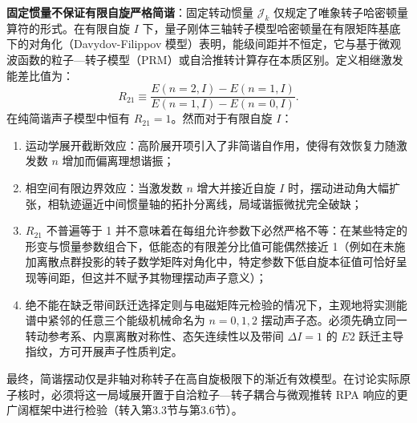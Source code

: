 \textbf{固定惯量不保证有限自旋严格简谐}：固定转动惯量 $\mathcal{J}_k$ 仅规定了唯象转子哈密顿量算符的形式。在有限自旋 $I$ 下，量子刚体三轴转子模型哈密顿量在有限矩阵基底下的对角化（Davydov-Filippov 模型）表明，能级间距并不恒定，它与基于微观波函数的粒子—转子模型（PRM）或自洽推转计算存在本质区别。定义相继激发能差比值为：
\begin{equation}\label{eq:3-2-anharmonic-ratio}
R_{21} \equiv \frac{E(n=2, I) - E(n=1, I)}{E(n=1, I) - E(n=0, I)}.
\end{equation}
在纯简谐声子模型中恒有 $R_{21} = 1$。然而对于有限自旋 $I$：
\begin{enumerate}
\item 运动学展开截断效应：高阶展开项引入了非简谐自作用，使得有效恢复力随激发数 $n$ 增加而偏离理想谐振；
\item 相空间有限边界效应：当激发数 $n$ 增大并接近自旋 $I$ 时，摆动进动角大幅扩张，相轨迹逼近中间惯量轴的拓扑分离线，局域谐振微扰完全破缺；
\item $R_{21}$ 不普遍等于 1 并不意味着在每组允许参数下必然严格不等：在某些特定的形变与惯量参数组合下，低能态的有限差分比值可能偶然接近 1（例如在未施加离散点群投影的转子数学矩阵对角化中，特定参数下低自旋本征值可恰好呈现等间距，但这并不赋予其物理摆动声子意义）；
\item 绝不能在缺乏带间跃迁选择定则与电磁矩阵元检验的情况下，主观地将实测能谱中紧邻的任意三个能级机械命名为 $n=0, 1, 2$ 摆动声子态。必须先确立同一转动参考系、内禀离散对称性、态矢连续性以及带间 $\Delta I = 1$ 的 $E2$ 跃迁主导指纹，方可开展声子性质判定。
\end{enumerate}

最终，简谐摆动仅是非轴对称转子在高自旋极限下的渐近有效模型。在讨论实际原子核时，必须将这一局域展开置于自洽粒子—转子耦合与微观推转 RPA 响应的更广阔框架中进行检验（转入第3.3节与第3.6节）。
